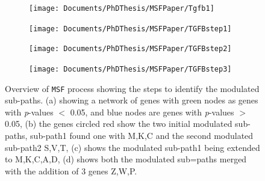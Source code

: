 \documentclass[twocolumn]{article}
\begin{document}
\begin{figure}[ht!]
	
	\begin{subfigure}{.5\textwidth}
		\centering
		\texttt{[image: Documents/PhDThesis/MSFPaper/Tgfb1]} 
		\caption{}
	\end{subfigure}
	\begin{subfigure}{.5\textwidth}
		\centering
		\texttt{[image: Documents/PhDThesis/MSFPaper/TGFBstep1]}
		\caption{}
	\end{subfigure}
	\begin{subfigure}{.5\textwidth}
		\centering
		\texttt{[image: Documents/PhDThesis/MSFPaper/TGFBstep2]} 
		\caption{}
	\end{subfigure}
	\begin{subfigure}{.5\textwidth}
		\centering
		\texttt{[image: Documents/PhDThesis/MSFPaper/TGFBstep3]}
		\caption{}
	\end{subfigure}
	\caption{Overview of \texttt{MSF} process showing the steps to identify the modulated sub-paths. (a) showing a network of genes with green nodes as genes with \textit{p}-values $< $ 0.05, and blue nodes are genes with \textit{p}-values $>$ 0.05, (b) the genes circled red show the two initial modulated sub-paths, sub-path1 found one with M,K,C and the second modulated sub-path2 S,V,T, (c) shows the modulated sub-path1 being extended to M,K,C,A,D, (d) shows both the modulated sub=paths merged with the addition of 3 genes Z,W,P.}
\end{figure}
\end{document}
